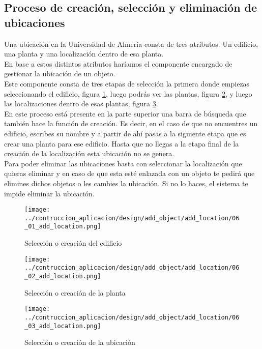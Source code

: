 \subsection{Proceso de creación, selección y eliminación de ubicaciones}
Una ubicación en la Universidad de Almería consta de tres atributos. Un edificio, una planta y una localización dentro de esa planta.
\\En base a estos distintos atributos haríamos el componente encargado de gestionar la ubicación de un objeto.
\\Este componente consta de tres etapas de selección la primera donde empiezas seleccionando el edificio, figura \ref{fig:1-loc-o}, luego podrás ver las plantas, figura \ref{fig:2-loc-o}, y luego las localizaciones dentro de esas plantas, figura \ref{fig:3-loc-o}.
\\En este proceso está presente en la parte superior una barra de búsqueda que también hace la función de creación. Es decir, en el caso de que no encuentres un edificio, escribes su nombre y a partir de ahí pasas a la siguiente etapa que es crear una planta para ese edificio. Hasta que no llegas a la etapa final de la creación de la localización esta ubicación no se genera.
\\Para poder eliminar las ubicaciones basta con seleccionar la localización que quieras eliminar y en caso de que esta esté enlazada con un objeto te pedirá que elimines dichos objetos o les cambies la ubicación. Si no lo haces, el sistema te impide eliminar la ubicación.
\begin{figure}[h]
    \centering
    \texttt{[image: ../contruccion\_aplicacion/design/add\_object/add\_location/06\_01\_add\_location.png]}
    \caption{Selección o creación del edificio}\label{fig:1-loc-o}
\end{figure}
\begin{figure}[h]
    \centering
    \texttt{[image: ../contruccion\_aplicacion/design/add\_object/add\_location/06\_02\_add\_location.png]}
    \caption{Selección o creación de la planta}\label{fig:2-loc-o}
\end{figure}
\begin{figure}[h]
    \centering
    \texttt{[image: ../contruccion\_aplicacion/design/add\_object/add\_location/06\_03\_add\_location.png]}
    \caption{Selección o creación de la ubicación}\label{fig:3-loc-o}
\end{figure}